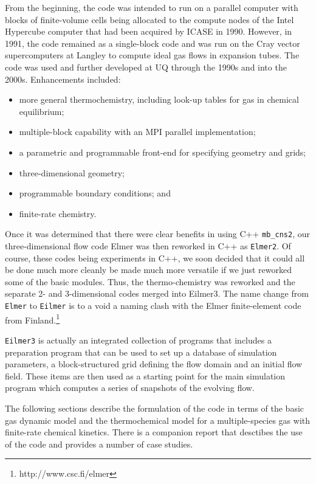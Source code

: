 \documentclass[12pt,a4paper,twoside]{article}
\begin{document}
\medskip
From the beginning, the code was intended to run on a parallel computer with 
blocks of finite-volume cells being allocated to the compute nodes of the Intel Hypercube computer
that had been acquired by ICASE in 1990.
However, in 1991, the code remained as a single-block code and was run on the 
Cray vector supercomputers at Langley to compute ideal gas flows in expansion tubes.
The code was used and further developed at UQ through the 1990s and into the 2000s.
Enhancements included:
\begin{itemize}
 \item more general thermochemistry, including look-up tables for gas in chemical equilibrium;
 \item multiple-block capability with an MPI parallel implementation;
 \item a parametric and programmable front-end for specifying geometry and grids;
 \item three-dimensional geometry; 
 \item programmable boundary conditions; and
 \item finite-rate chemistry.
\end{itemize}

\medskip
Once it was determined that there were clear benefits in using C++ \texttt{mb\_cns2},
our three-dimensional flow code Elmer was then reworked in C++ as \texttt{Elmer2}.
Of course, these codes being experiments in C++, we soon decided that it could all be done
much more cleanly be made much more versatile if we just reworked some of the basic modules.
Thus, the thermo-chemistry was reworked and the separate 2- and 3-dimensional codes merged
into Eilmer3.
The name change from \texttt{Elmer} to \texttt{Eilmer} is to a void a naming clash with the Elmer finite-element code 
from Finland.\footnote{http://www.csc.fi/elmer} 

\medskip
\texttt{Eilmer3} is actually an integrated collection of programs that includes a preparation program 
that can be used to set up a database of simulation parameters, 
a block-structured grid defining the flow domain and an initial flow field.
These items are then used as a starting point for the main simulation program
which computes a series of snapshots of the evolving flow.

\medskip 
The following sections describe the formulation of the code in terms of the basic gas dynamic model
and the thermochemical model for a multiple-species gas with finite-rate chemical kinetics.
There is a companion report \cite{jacobs_gollan_2010a} that desctibes the use of the code and provides 
a number of case studies.
\end{document}
